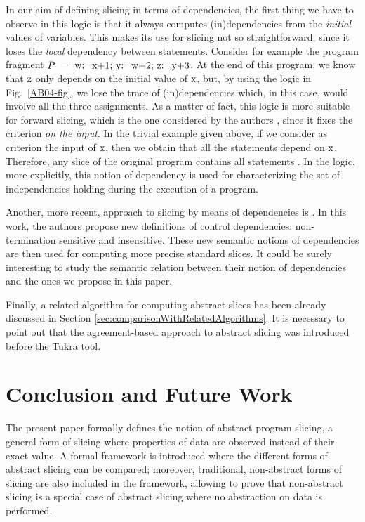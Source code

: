 \documentclass[prodmode,acmtocl]{acmsmall}
\def\prog{\ensuremath{P}\xspace}
\newcommand{\0}{\mbox{\bf 0}}
\newcommand{\CODE}[1]{\ensuremath{\mbox{\lstinline!#1!}\xspace}\xspace}
\def\xx{\CODE{x}}
\def\zz{\CODE{z}}
\begin{document}
\noindent
In our aim of defining slicing in terms of dependencies, the first
thing we have to observe in this logic is that it always computes
(in)dependencies from the \emph{initial} values of variables. This
makes its use for slicing not so straightforward, since it loses the
\emph{local} dependency between statements.  Consider for example the
program fragment $\prog~=~\mbox{\CODE{w:=x+1; y:=w+2; z:=y+3}}$.  At
the end of this program, we know that \zz only depends on the initial
value of \xx, but, by using the logic in Fig.~\ref{AB04-fig}, we lose
the trace of (in)dependencies which, in this case, would involve all
the three assignments.  As a matter of fact, this logic is more
suitable for forward slicing, which is the one considered by the
authors \cite{AB07}, since it fixes the criterion \emph{on the input}.
In the trivial example given above, if we consider as criterion the
input of \xx, then we obtain that all the statements depend on \xx.
Therefore, any slice of the original program contains all statements
\cite{AB07}.
In the logic, more explicitly, this notion of dependency is used for
characterizing the set of independencies holding during the execution
of a program.

Another, more recent, approach to slicing by means of dependencies is
\cite{Danicic11}.  In this work, the authors propose new definitions
of control dependencies: non-termination sensitive and insensitive.
These new semantic notions of dependencies are then used for computing
more precise standard slices.  It could be surely interesting to study
the semantic relation between their notion of dependencies and the
ones we propose in this paper.

Finally, a related algorithm for computing abstract slices has been
already discussed in Section
\ref{sec:comparisonWithRelatedAlgorithms}.  It is necessary to point
out that the agreement-based approach to abstract slicing
\cite{Zanardini} was introduced before the Tukra tool.


\section{Conclusion and Future Work}
The present paper formally defines the notion of abstract program
slicing, a general form of slicing where properties of data are
observed instead of their exact value.  A formal framework is
introduced where the different forms of abstract slicing can be
compared; moreover, traditional, non-abstract forms of slicing are
also included in the framework, allowing to prove that non-abstract
slicing is a special case of abstract slicing where no abstraction on
data is performed.
\end{document}
